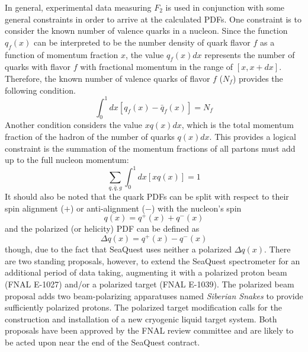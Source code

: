 In general, experimental data measuring $F_2$ is used in conjunction with some general constraints in order to arrive at the calculated PDFs. One constraint is to consider the known number of valence quarks in a nucleon. Since the function $q_f(x)$ can be interpreted to be the number density of quark flavor $f$ as a function of momentum fraction $x$, the value $q_f(x)dx$ represents the number of quarks with flavor $f$ with fractional momentum in the range of $[x,x+dx]$. Therefore, the known number of valence quarks of flavor $f$ ($N_f$) provides the following condition.
\begin{equation}
\int_0^1 dx [q_f(x) - \bar{q}_f(x)] = N_{f}
\label{eq:vsr}
\end{equation}
Another condition considers the value $x q(x) dx$, which is the total momentum fraction of the hadron of the number of quarks $q(x)dx$. This provides a logical constraint is the summation of the momentum fractions of all partons must add up to the full nucleon momentum:
\begin{equation}
\sum_{q,\bar{q},g} \int_0^1 dx [x q(x)] = 1
\end{equation}
It should also be noted that the quark PDFs can be split with respect to their spin alignment ($+$) or anti-alignment ($-$) with the nucleon's spin
\begin{equation}
q(x) = q^+(x) + q^-(x)
\end{equation}
and the polarized (or helicity) PDF can be defined as
\begin{equation}
\Delta q(x) = q^+(x) - q^-(x)
\end{equation}
though, due to the fact that SeaQuest uses neither a polarized $\Delta q(x)$. There are two standing proposals, however, to extend the SeaQuest spectrometer for an additional period of data taking, augmenting it with a polarized proton beam (FNAL E-1027) and/or a polarized target (FNAL E-1039). The polarized beam proposal adds two beam-polarizing apparatuses named \emph{Siberian Snakes} to provide sufficiently polarized protons. The polarized target modification calls for the construction and installation of a new cryogenic liquid target system. Both proposals have been approved by the FNAL review committee and are likely to be acted upon near the end of the SeaQuest contract.

